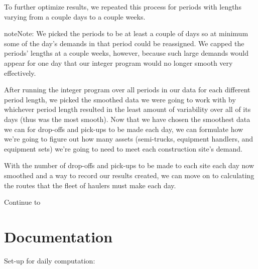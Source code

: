 \documentclass[letterpaper,10pt,english]{sphinxmanual}
\begin{document}
To further optimize results, we repeated this process for periods with
lengths varying from a couple days to a couple weeks.

\begin{sphinxadmonition}{note}{Note:}
We picked the periods to be at least a couple of days so at minimum some
of the day's demands in that period could be reassigned. We capped the
periods' lengths at a couple weeks, however, because such large demands
would appear for one day that our integer program would no longer smooth
very effectively.
\end{sphinxadmonition}

After running the integer program over all periods in our data for each
different period length, we picked the smoothed data we were going to work
with by whichever period length resulted in the least amount of variability
over all of its days (thus was the most smooth). Now that we have chosen the
smoothest data we can for drop-offs and pick-ups to be made each day, we can
formulate how we're going to figure out how many assets (semi-trucks,
equipment handlers, and equipment sets) we're going to need to meet each
construction site's demand.

With the number of drop-offs and pick-ups to be made to each site each day
now smoothed and a way to record our results created, we can move on to
calculating the routes that the fleet of haulers must make each day.

Continue to {\hyperref[\detokenize{daily-routing:daily-routing}]{}}


\section{Documentation}
\label{\detokenize{variation:documentation}}
Set-up for daily computation:
\end{document}
